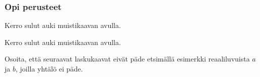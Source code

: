 \begin{tehtavasivu}

\subsubsection*{Opi perusteet}

\begin{tehtava}
    Kerro sulut auki muistikaavan avulla.
    \begin{alakohdat}
    \end{alakohdat}
    \begin{vastaus}
        \begin{alakohdat}
        \end{alakohdat}
    \end{vastaus}
\end{tehtava}

\begin{tehtava}
    Kerro sulut auki muistikaavan avulla.
    \begin{alakohdat}
    \end{alakohdat}
    \begin{vastaus}
        \begin{alakohdat}
        \end{alakohdat}
    \end{vastaus}
\end{tehtava}

\begin{tehtava}
Osoita, että seuraavat laskukaavat eivät päde etsimällä esimerkki reaaliluvuista $a$ ja $b$, joilla yhtälö ei päde.
        \begin{alakohdat}
        \end{alakohdat}
        \begin{vastaus}
        \begin{alakohdatrivi}
        \end{alakohdatrivi}
        \end{vastaus}
\end{tehtava}


\end{tehtavasivu}
